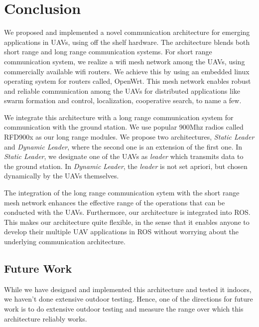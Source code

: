 
\chapter{Conclusion} %

\label{Chapter4} %


We proposed and implemented a novel communication architecture for emerging applications in UAVs, using off the shelf hardware. The architecture blends both short range and long range communication systems. For short range communication system, we realize a wifi mesh network among the UAVs, using commercially available wifi routers. We achieve this by using an embedded linux operating system for routers called, OpenWrt. This mesh network enables robust and reliable communication among the UAVs for distributed applications like swarm formation and control, localization, cooperative search, to name a few.

We integrate this architecture with a long range communication system for communication with the ground station. We use popular 900Mhz radios called RFD900x as our long range modules. We propose two architectures, \textit{Static Leader} and \textit{Dynamic Leader}, where the second one is an extension of the first one. In \textit{Static Leader}, we designate one of the UAVs as \textit{leader} which transmits data to the ground station. In \textit{Dynamic Leader}, the \textit{leader} is not set apriori, but chosen dynamically by the UAVs themselves.

The integration of the long range communication sytem with the short range mesh network enhances the effective range of the operations that can be conducted with the  UAVs. Furthermore, our architecture is integrated into ROS. This makes our architecture quite flexible, in the sense that it enables anyone to develop their multiple UAV applications in ROS without worrying about the underlying communication architecture.

\section{Future Work}
While we have designed and implemented this architecture and tested it indoors, we haven't done extensive outdoor testing. Hence, one of the directions for future work is to do extensive outdoor testing and measure the range over which this architecture reliably works.

